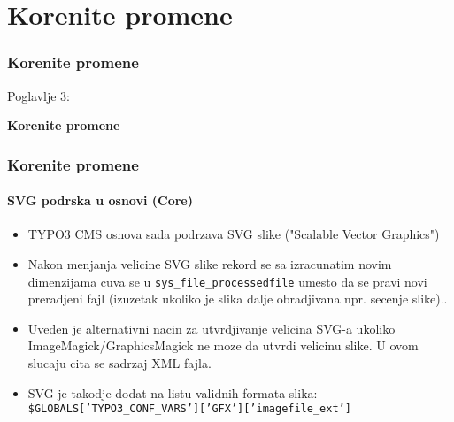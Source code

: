 %

\section{Korenite promene}
\begin{frame}[fragile]
	\frametitle{Korenite promene}

	\begin{center}\huge{Poglavlje 3:}\end{center}
	\begin{center}\huge{\color{typo3darkgrey}\textbf{Korenite promene}}\end{center}

\end{frame}

\begin{frame}[fragile]
	\frametitle{Korenite promene}
	\framesubtitle{SVG podrska u osnovi (Core)}

	\begin{itemize}
		\item TYPO3 CMS osnova sada podrzava SVG slike ("Scalable Vector Graphics")

		\item Nakon menjanja velicine SVG slike rekord se sa izracunatim novim dimenzijama cuva se u
		\texttt{sys\_file\_processedfile} umesto da se pravi novi preradjeni fajl \newline
			\small(izuzetak ukoliko je slika dalje obradjivana npr. secenje slike).\normalsize.

		\item Uveden je alternativni nacin za utvrdjivanje velicina SVG-a ukoliko ImageMagick/GraphicsMagick ne moze da utvrdi velicinu slike. U ovom slucaju cita se sadrzaj XML fajla.

		\item SVG je takodje dodat na listu validnih formata slika:\newline
			\texttt{\$GLOBALS['TYPO3\_CONF\_VARS']['GFX']['imagefile\_ext']}

	\end{itemize}

\end{frame}

